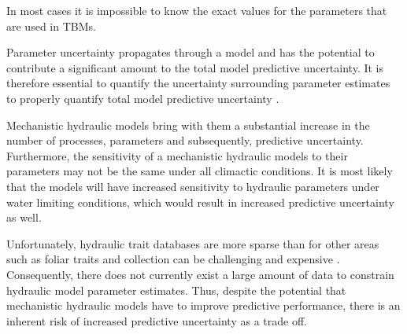 In most cases it is impossible to know the exact values for the  parameters that are used in TBMs. 



Parameter uncertainty propagates through a model and has the potential to contribute a significant amount to the total model predictive uncertainty. It is therefore essential to quantify the uncertainty surrounding parameter estimates to properly quantify total model predictive uncertainty \citep{dietze_2017, dietze_2017a}. 

Mechanistic hydraulic models bring with them a substantial increase in the number of processes, parameters and subsequently, predictive uncertainty. Furthermore, the sensitivity of a mechanistic hydraulic models to their parameters may not be the same under all climactic conditions. It is most likely that the models will have increased sensitivity to hydraulic parameters under water limiting conditions, which would result in increased predictive uncertainty as well.


Unfortunately, hydraulic trait databases are more sparse than for other areas such as foliar traits and collection can be challenging and expensive \citep{choat_2018}. Consequently, there does not currently exist a large amount of data to constrain hydraulic model parameter estimates.  Thus, despite the potential that mechanistic hydraulic models have to improve predictive performance, there is an inherent risk of increased predictive uncertainty as a trade off.